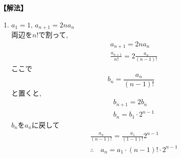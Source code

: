 \documentclass[dvipdfmx,a4paper,11pt,fleqn,openany]{jsbook}
\begin{document}
      \noindent\textbf{【解法】}
      \begin{enumerate}[label=(\arabic*),parsep=3pt]
        \item $\displaystyle a_1=1,\, a_{n+1}=2na_n$\\
              両辺を$n!$で割って,
              \begin{align*}
                &a_{n+1}=2na_n\\
                &\frac{a_{n+1}}{n!}=2\frac{a_n}{(n-1)!}
              \end{align*}
              ここで
              \[
                b_n=\frac{a_n}{(n-1)!}
              \]
              と置くと,
              \begin{align*} 
                &b_{n+1}=2b_n\\
                &b_n=b_1\cdot 2^{n-1}
              \end{align*}
              $b_n$を$a_n$に戻して
              \begin{align*} 
                &\frac{a_n}{(n-1)!}=\frac{a_1}{(1-1)!}2^{n-1}\\
                &\therefore \quad a_n=a_1 \cdot (n-1)! \cdot 2^{n-1}
              \end{align*}
              

\end{enumerate}
\end{document}
